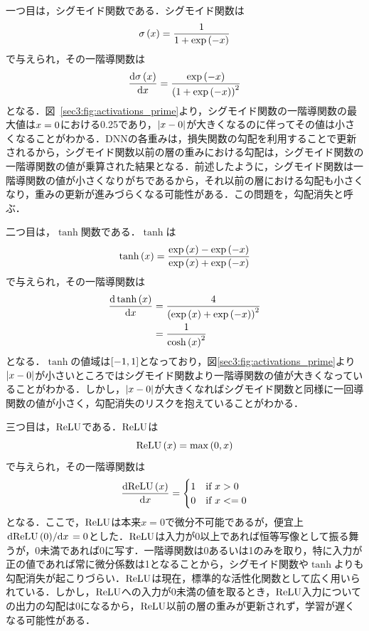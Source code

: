 \documentclass[12pt]{jarticle}
\numberwithin{equation}{section}    %
\numberwithin{figure}{section}      %
\numberwithin{table}{section}      %
\begin{document}
一つ目は，シグモイド関数である．シグモイド関数は
\begin{equation}
    \sigma\left(x\right) = \frac{1}{1 + \exp\left(-x\right)}
\end{equation}
で与えられ，その一階導関数は
\begin{equation}
    \dv{\sigma\left(x\right)}{x} = \frac{\exp\left(-x\right)}{\left(1 + \exp\left(-x\right)\right)^{2}}
\end{equation}
となる．図~\ref{sec3:fig:activations_prime}より，シグモイド関数の一階導関数の最大値は$x=0$における0.25であり，$\left|x - 0\right|$が大きくなるのに伴ってその値は小さくなることがわかる．DNNの各重みは，損失関数の勾配を利用することで更新されるから，シグモイド関数以前の層の重みにおける勾配は，シグモイド関数の一階導関数の値が乗算された結果となる．前述したように，シグモイド関数は一階導関数の値が小さくなりがちであるから，それ以前の層における勾配も小さくなり，重みの更新が進みづらくなる可能性がある．この問題を，勾配消失と呼ぶ．

二つ目は，$\tanh$関数である．$\tanh$は
\begin{equation}
    \tanh\left(x\right) = \frac{\exp\left(x\right) - \exp\left(-x\right)}{\exp\left(x\right) + \exp\left(-x\right)}
\end{equation}
で与えられ，その一階導関数は
\begin{align}
    \dv{\tanh\left(x\right)}{x} & = \frac{4}{\left(\exp\left(x\right) + \exp\left(-x\right)\right)^{2}} \\
                                  & = \frac{1}{\cosh\left(x\right)^{2}}
\end{align}
となる．$\tanh$の値域は$\left[-1, 1\right]$となっており，図\ref{sec3:fig:activations_prime}より$\left|x - 0\right|$が小さいところではシグモイド関数より一階導関数の値が大きくなっていることがわかる．しかし，$\left|x - 0\right|$が大きくなればシグモイド関数と同様に一回導関数の値が小さく，勾配消失のリスクを抱えていることがわかる．

三つ目は，$\text{ReLU}$である．$\text{ReLU}$は
\begin{equation}
    \text{ReLU}\left(x\right) = \max \left(0, x\right)
\end{equation}
で与えられ，その一階導関数は
\begin{equation}
    \dv{\text{ReLU}\left(x\right)}{x} =
    \begin{cases}
        1 & \text{if $x > 0$}  \\
        0 & \text{if $x <= 0$}
    \end{cases}
\end{equation}
となる．ここで，$\text{ReLU}$は本来$x = 0$で微分不可能であるが，便宜上$\dv*{\text{ReLU}\left(0\right)}{x} = 0$とした．$\text{ReLU}$は入力が0以上であれば恒等写像として振る舞うが，0未満であれば0に写す．一階導関数は0あるいは1のみを取り，特に入力が正の値であれば常に微分係数は1となることから，シグモイド関数や$\tanh$よりも勾配消失が起こりづらい．$\text{ReLU}$は現在，標準的な活性化関数として広く用いられている．しかし，$\text{ReLU}$への入力が0未満の値を取るとき，$\text{ReLU}$入力についての出力の勾配は0になるから，$\text{ReLU}$以前の層の重みが更新されず，学習が遅くなる可能性がある．
\end{document}
